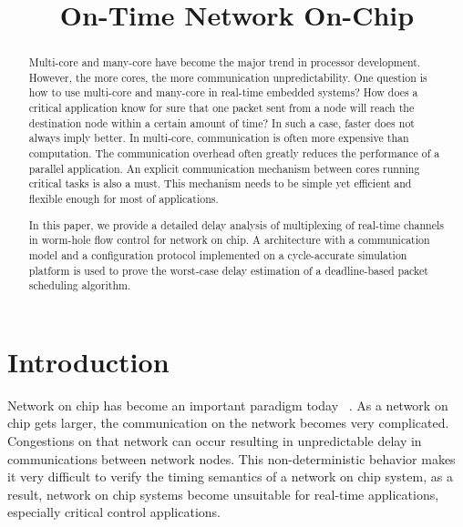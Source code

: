 \documentclass[conference, twocolumn]{IEEEtran}
\theoremstyle{definition}
\begin{document}
\title{On-Time Network On-Chip}


\maketitle

\begin{abstract}
Multi-core and many-core have become the major trend in processor development.
However, the more cores, the more communication unpredictability. One
question is how to use multi-core and many-core in real-time embedded systems?
How does a critical application know for sure that one packet sent from a node
will reach the destination node within a certain amount of time? In such a
case, faster does not always imply better. In multi-core, communication is
often more expensive than computation. The communication overhead often
greatly reduces the performance of a parallel application. An explicit
communication mechanism between cores running critical tasks is also a must.
This mechanism needs to be simple yet efficient and flexible enough for most of
applications.

In this paper, we provide a detailed delay analysis of multiplexing of real-time
channels in worm-hole flow control for network on chip. A
architecture with a communication model and a configuration protocol
implemented on a cycle-accurate simulation platform is used to prove the worst-case delay estimation of a deadline-based
packet scheduling algorithm.

\end{abstract}

\section{Introduction}
Network on chip has become an important paradigm today
~\cite{DallyPacketNotWire}. As a network on chip gets larger, the communication on the network becomes very complicated. Congestions on that network can occur
resulting in unpredictable delay in communications between network nodes. This non-deterministic behavior 
makes it very difficult to verify the timing semantics of a network on chip 
system, as a result, network on chip systems become unsuitable for real-time 
applications, especially critical control applications.
\end{document}
